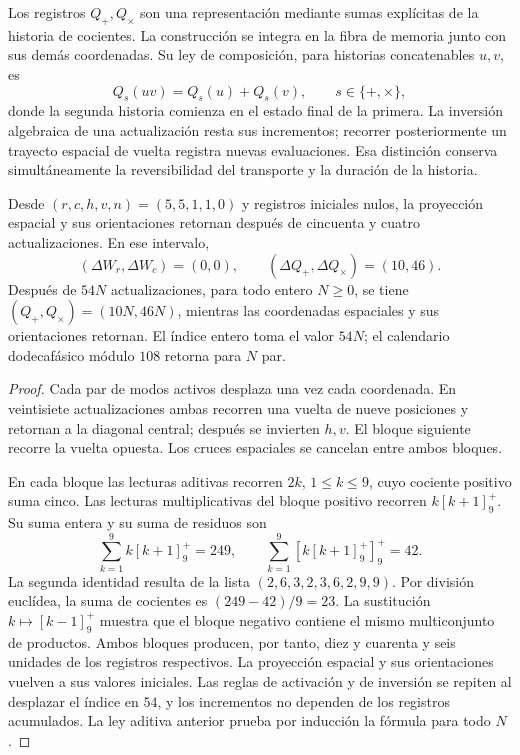 Los registros \(Q_+,Q_\times\) son una representación mediante sumas explícitas
de la historia de cocientes. La construcción se integra en la fibra
de memoria junto con sus demás coordenadas. Su ley de composición,
para historias concatenables \(u,v\), es
\[
 Q_s(uv)=Q_s(u)+Q_s(v),\qquad s\in\{+,\times\},
\]
donde la segunda historia comienza en el estado final de la primera.
La inversión algebraica de una actualización resta sus incrementos;
recorrer posteriormente un trayecto espacial de vuelta registra
nuevas evaluaciones. Esa distinción conserva simultáneamente la
reversibilidad del transporte y la duración de la historia.

\begin{proposition}
\label{ii:electron-memoria-retorno}
Desde \((r,c,h,v,n)=(5,5,1,1,0)\) y registros iniciales nulos, la
proyección espacial y sus orientaciones retornan después de cincuenta y cuatro
actualizaciones. En ese intervalo,
\[
 (\Delta W_r,\Delta W_c)=(0,0),\qquad
 (\Delta Q_+,\Delta Q_\times)=(10,46).
\]
Después de \(54N\) actualizaciones, para todo entero \(N\geq0\),
se tiene \((Q_+,Q_\times)=(10N,46N)\), mientras las coordenadas
espaciales y sus orientaciones retornan. El índice entero toma el valor
\(54N\); el calendario dodecafásico módulo \(108\) retorna para
\(N\) par.
\end{proposition}
\begin{proof}
Cada par de modos activos desplaza una vez cada coordenada. En
veintisiete actualizaciones ambas recorren una vuelta de nueve
posiciones y retornan a la diagonal central; después se invierten
\(h,v\). El bloque siguiente recorre la vuelta opuesta. Los cruces
espaciales se cancelan entre ambos bloques.

En cada bloque las lecturas aditivas recorren \(2k\),
\(1\leq k\leq9\), cuyo cociente positivo suma cinco. Las lecturas
multiplicativas del bloque positivo recorren
\(k[k+1]^+_9\). Su suma entera y su suma de residuos son
\[
 \sum_{k=1}^9 k[k+1]^+_9=249,\qquad
 \sum_{k=1}^9[k[k+1]^+_9]^+_9=42.
\]
La segunda identidad resulta de la lista
\((2,6,3,2,3,6,2,9,9)\). Por división euclídea,
la suma de cocientes es \((249-42)/9=23\). La sustitución
\(k\mapsto[k-1]^+_9\) muestra que el bloque negativo contiene
el mismo multiconjunto de productos. Ambos bloques producen, por
tanto, diez y cuarenta y seis unidades de los registros respectivos.
La proyección espacial y sus orientaciones vuelven a sus valores
iniciales. Las reglas de activación y de inversión se repiten al
desplazar el índice en \(54\), y los incrementos no dependen de los
registros acumulados. La ley aditiva
anterior prueba por inducción la fórmula para todo \(N\).
\end{proof}

